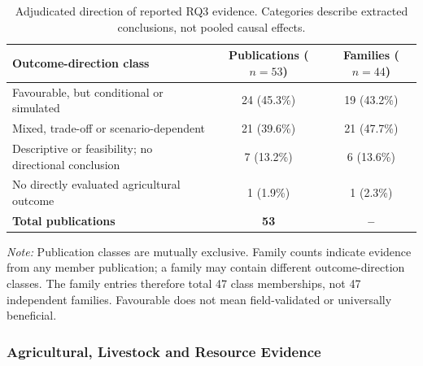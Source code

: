 \documentclass[11pt,a4paper]{article}
\begin{document}
\begin{table}[htbp]
\centering
\small

\caption{Adjudicated direction of reported RQ3 evidence.
Categories describe extracted conclusions, not pooled
causal effects.}

\label{tab:rq3_outcome_direction}

\begin{tabularx}{\textwidth}{@{}Xcc@{}}
\toprule

\textbf{Outcome-direction class} &
\textbf{Publications ($n=53$)} &
\textbf{Families ($n=44$)} \\

\midrule

Favourable, but conditional or simulated &
24 (45.3\%) & 19 (43.2\%) \\

Mixed, trade-off or scenario-dependent &
21 (39.6\%) & 21 (47.7\%) \\

Descriptive or feasibility; no directional conclusion &
7 (13.2\%) & 6 (13.6\%) \\

No directly evaluated agricultural outcome &
1 (1.9\%) & 1 (2.3\%) \\

\midrule

\textbf{Total publications} &
\textbf{53} & \textbf{--} \\

\bottomrule
\end{tabularx}

\par\smallskip

\begin{minipage}{\textwidth}
\footnotesize

\emph{Note:} Publication classes are mutually exclusive.
Family counts indicate evidence from any member publication;
a family may contain different outcome-direction classes.
The family entries therefore total 47 class memberships,
not 47 independent families. Favourable does not mean
field-validated or universally beneficial.

\end{minipage}

\end{table}

\subsubsection{Agricultural, Livestock and Resource Evidence}
\end{document}
